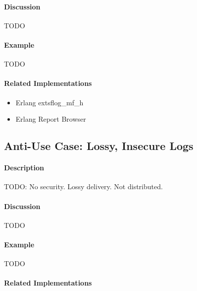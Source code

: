 \paragraph{Discussion}

{\Large TODO}

\paragraph{Example}

{\Large TODO}

\paragraph{Related Implementations}

\begin{itemize}
        \item Erlang         extsf{log\_mf\_h}
        \item Erlang Report Browser
\end{itemize}

\subsection{Anti-Use Case: Lossy, Insecure Logs}

\paragraph{Description}

{\Large TODO:} No security.  Lossy delivery.  Not distributed.

\paragraph{Discussion}

{\Large TODO}

\paragraph{Example}

{\Large TODO}

\paragraph{Related Implementations}


